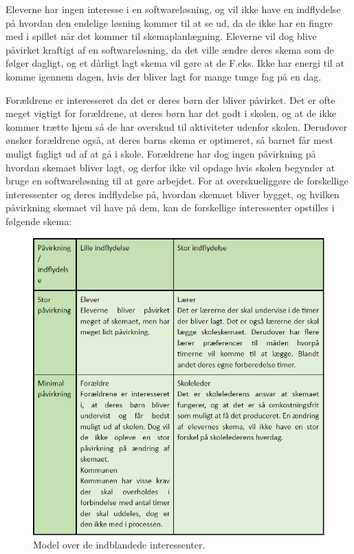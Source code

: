Eleverne har ingen interesse i en softwareløsning, og vil ikke have en indflydelse på hvordan den endelige løsning kommer til at se ud, da de ikke har en fingre med i spillet når det kommer til skemaplanlægning. Eleverne vil dog blive påvirket kraftigt af en softwareløsning, da det ville ændre deres skema som de følger dagligt, og et dårligt lagt skema vil gøre at de F.eks. Ikke har energi til at komme igennem dagen, hvis der bliver lagt for mange tunge fag på en dag.


Forældrene er interesseret da det er deres børn der bliver påvirket. Det er ofte meget vigtigt for forældrene, at deres børn har det godt i skolen, og at de ikke kommer trætte hjem så de har overskud til aktiviteter udenfor skolen. Derudover ønsker forældrene også, at deres barns skema er optimeret, så barnet får mest muligt fagligt ud af at gå i skole. Forældrene har dog ingen påvirkning på hvordan skemaet bliver lagt, og derfor ikke vil opdage hvis skolen begynder at bruge en softwareløsning til at gøre arbejdet.
For at overskueliggøre de forskellige interessenter og deres indflydelse på, hvordan skemaet bliver bygget, og hvilken påvirkning skemaet vil have på dem, kan de forskellige interessenter opstilles i følgende skema:
\begin{figure}[!h]
  \centering
  \includegraphics[width=\textwidth]{partials/graphics/interessentanalyse.png}
  \caption{Model over de indblandede interessenter.}
  \label{fig:interessenter}
\end{figure}
